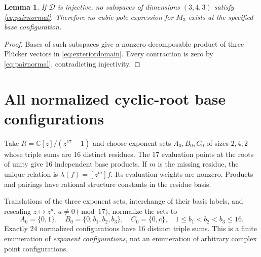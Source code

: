 \documentclass[11pt]{article}
\newtheorem{lemma}[theorem]{Lemma}
\theoremstyle{definition}\newtheorem{definition}[theorem]{Definition}
\theoremstyle{remark}\newtheorem{remark}[theorem]{Remark}
\newcommand{\C}{\mathbb C}
\begin{document}
\begin{lemma}\label{lem:exterior}
If $\mathcal D$ is injective, no subspaces of dimensions $(3,4,3)$ satisfy
\eqref{eq:pairnormal}. Therefore no cubic-pole expression for $M_3$ exists
at the specified base configuration.
\end{lemma}
\begin{proof}
Bases of such subspaces give a nonzero decomposable product of three
Pl\"ucker vectors in \eqref{eq:exteriordomain}. Every contraction is zero by
\eqref{eq:pairnormal}, contradicting injectivity.
\end{proof}

\section{All normalized cyclic-root base configurations}

Take $R=\C[z]/(z^{17}-1)$ and choose exponent sets $A_0,B_0,C_0$ of sizes
$2,4,2$ whose triple sums are 16 distinct residues. The 17 evaluation points
at the roots of unity give 16 independent base products. If $m$ is the
missing residue, the unique relation is $\lambda(f)=[z^m]f$. Its evaluation
weights are nonzero. Products and pairings have rational structure constants
in the residue basis.

Translations of the three exponent sets, interchange of their basis labels,
and rescaling $z\mapsto z^a$, $a\ne0\pmod {17}$, normalize the sets to
\begin{equation}\label{eq:rootnorm}
 A_0=\{0,1\},\quad B_0=\{0,b_1,b_2,b_3\},\quad C_0=\{0,c\},
 \quad 1\leq b_1<b_2<b_3\leq16.
\end{equation}
Exactly 24 normalized configurations have 16 distinct triple sums. This is
a finite enumeration of \emph{exponent configurations}, not an enumeration
of arbitrary complex point configurations.
\end{document}
